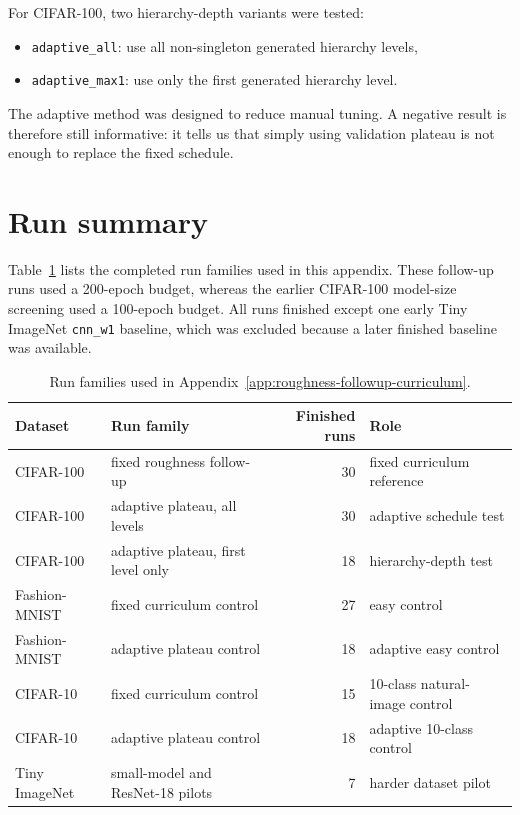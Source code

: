 For CIFAR-100, two hierarchy-depth variants were tested:

\begin{itemize}
    \item \texttt{adaptive\_all}: use all non-singleton generated hierarchy levels,
    \item \texttt{adaptive\_max1}: use only the first generated hierarchy level.
\end{itemize}

The adaptive method was designed to reduce manual tuning. A negative result is
therefore still informative: it tells us that simply using validation plateau is
not enough to replace the fixed schedule.

\section{Run summary}

Table~\ref{tab:appg-run-summary} lists the completed run families used in this
appendix. These follow-up runs used a 200-epoch budget, whereas the earlier
CIFAR-100 model-size screening used a 100-epoch budget. All runs finished except
one early Tiny ImageNet
\cite{tinyimagenet,deng2009imagenet} \texttt{cnn\_w1} baseline, which was
excluded because a later finished baseline was available.

\begin{table}[h]
\centering
\small
\begin{tabular}{llrl}
\hline
Dataset & Run family & Finished runs & Role \\
\hline
CIFAR-100 & fixed roughness follow-up & 30 & fixed curriculum reference \\
CIFAR-100 & adaptive plateau, all levels & 30 & adaptive schedule test \\
CIFAR-100 & adaptive plateau, first level only & 18 & hierarchy-depth test \\
Fashion-MNIST & fixed curriculum control & 27 & easy control \\
Fashion-MNIST & adaptive plateau control & 18 & adaptive easy control \\
CIFAR-10 & fixed curriculum control & 15 & 10-class natural-image control \\
CIFAR-10 & adaptive plateau control & 18 & adaptive 10-class control \\
Tiny ImageNet & small-model and ResNet-18 pilots & 7 & harder dataset pilot \\
\hline
\end{tabular}
\caption{Run families used in Appendix~\ref{app:roughness-followup-curriculum}.}
\label{tab:appg-run-summary}
\end{table}

